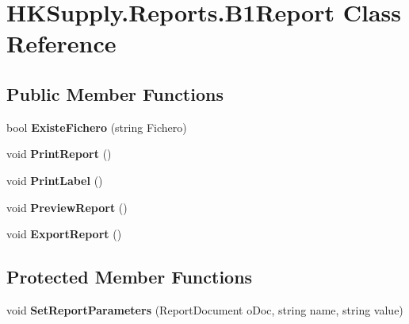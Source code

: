 \hypertarget{class_h_k_supply_1_1_reports_1_1_b1_report}{}\section{H\+K\+Supply.\+Reports.\+B1\+Report Class Reference}
\label{class_h_k_supply_1_1_reports_1_1_b1_report}
\subsection*{Public Member Functions}
\begin{DoxyCompactItemize}
\item 
\mbox{\label{class_h_k_supply_1_1_reports_1_1_b1_report_a9d759216f20bc69a35c9380ad542cafd}} 
bool {\bfseries Existe\+Fichero} (string Fichero)
\item 
\mbox{\label{class_h_k_supply_1_1_reports_1_1_b1_report_a0dc4c6d40cc3f0ddf2c441cc4989ffc6}} 
void {\bfseries Print\+Report} ()
\item 
\mbox{\label{class_h_k_supply_1_1_reports_1_1_b1_report_a42c46212dfd8e0b4959c4e74fa317b1b}} 
void {\bfseries Print\+Label} ()
\item 
\mbox{\label{class_h_k_supply_1_1_reports_1_1_b1_report_aa904d91869b039a37884b30d0f4cbab7}} 
void {\bfseries Preview\+Report} ()
\item 
\mbox{\label{class_h_k_supply_1_1_reports_1_1_b1_report_a43a8ca800f3162c6f1954c578dd72049}} 
void {\bfseries Export\+Report} ()
\end{DoxyCompactItemize}
\subsection*{Protected Member Functions}
\begin{DoxyCompactItemize}
\item 
\mbox{\label{class_h_k_supply_1_1_reports_1_1_b1_report_aaa3735e88af09242ce4618e47552f3c3}} 
void {\bfseries Set\+Report\+Parameters} (Report\+Document o\+Doc, string name, string value)
\end{DoxyCompactItemize}
